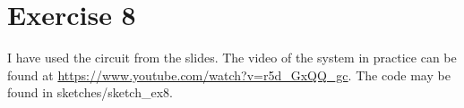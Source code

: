 \part*{Exercise 8}
I have used the circuit from the slides. The video of the system in practice can be found at \url{https://www.youtube.com/watch?v=r5d_GxQQ_gc}. The code may be found in sketches/sketch\_ex8.